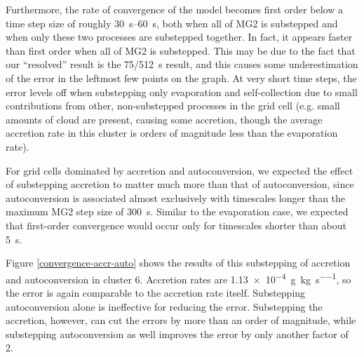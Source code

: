 \documentclass [11pt, proquest] {uwthesis}[2020/02/24]
\begin{document}
Furthermore, the rate of convergence of the model becomes first order below a time step size of roughly \SIrange{30}{60}{\second}, both when all of MG2 is substepped and when only these two processes are substepped together. In fact, it appears faster than first order when all of MG2 is substepped. This may be due to the fact that our ``resolved'' result is the \SI{75/512}{\second} result, and this causes some underestimation of the error in the leftmost few points on the graph. At very short time steps, the error levels off when substepping only evaporation and self-collection due to small contributions from other, non-substepped processes in the grid cell (e.g. small amounts of cloud are present, causing some accretion, though the average accretion rate in this cluster is orders of magnitude less than the evaporation rate).

For grid cells dominated by accretion and autoconversion, we expected the effect of substepping accretion to matter much more than that of autoconversion, since autoconversion is associated almost exclusively with timescales longer than the maximum MG2 step size of \SI{300}{\second}. Similar to the evaporation case, we expected that first-order convergence would occur only for timescales shorter than about \SI{5}{\second}.

Figure \ref{convergence-accr-auto} shows the results of this substepping of accretion and autoconversion in cluster 6. Accretion rates are \SI{1.13e-4}{\gram\per\kilo\gram\per\second}, so the error is again comparable to the accretion rate itself. Substepping autoconversion alone is ineffective for reducing the error. Substepping the accretion, however, can cut the errors by more than an order of magnitude, while substepping autoconversion as well improves the error by only another factor of \num{2}.
\end{document}
